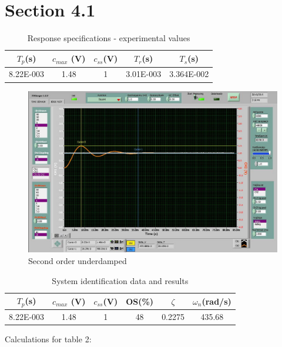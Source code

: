 \documentclass{article}
\begin{document}

\section*{Section 4.1} %
\label{sec:section_4_1}
\begin{table}[!htbp]
\centering
    \begin{tabular}{|c|c|c|c|c|}
        \hline
        $T_p$(s) & $c_{max}$ (V) & $c_{ss}$(V) & $T_r$(s) & $T_s$(s)\\
        \hline
        8.22E-003 & 1.48 & 1 & 3.01E-003 & 3.364E-002\\
        \hline
    \end{tabular}
    \caption{Response specifications - experimental values}
\end{table}
\begin{figure}[!htbp]
\centering
\includegraphics[width=7in]{4_1.jpg}
\caption{Second order underdamped}
\end{figure}
\begin{table}[!htbp]
\centering
    \begin{tabular}{|c|c|c|c|c|c|}
        \hline
        $T_p$(s) & $c_{max}$ (V) & $c_{ss}$(V) & OS(\%) & $\zeta$ & $\omega_n$(rad/s)\\
        \hline
        8.22E-003 & 1.48 & 1 & 48 & 0.2275 & 435.68\\
        \hline
    \end{tabular}
    \caption{System identification data and results}
\end{table}
\newpage

Calculations for table 2:
\end{document}
